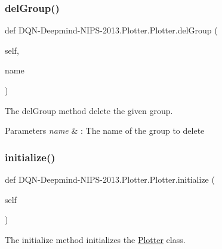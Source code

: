 \subsubsection{\texorpdfstring{del\+Group()}{delGroup()}}
{\footnotesize\ttfamily def D\+QN-\/Deepmind-\/N\+I\+PS-\/2013.Plotter.\+Plotter.\+del\+Group (\begin{DoxyParamCaption}\item[{}]{self,  }\item[{}]{name }\end{DoxyParamCaption})}



The del\+Group method delete the given group. 


\begin{DoxyParams}{Parameters}
{\em name} & \+: The name of the group to delete \\
\hline
\end{DoxyParams}
\hypertarget{classDQN-Deepmind-NIPS-2013_1_1Plotter_1_1Plotter_a8e1227cf851a49de8362084fe06846fa}{}\label{classDQN-Deepmind-NIPS-2013_1_1Plotter_1_1Plotter_a8e1227cf851a49de8362084fe06846fa} 
\subsubsection{\texorpdfstring{initialize()}{initialize()}}
{\footnotesize\ttfamily def D\+QN-\/Deepmind-\/N\+I\+PS-\/2013.Plotter.\+Plotter.\+initialize (\begin{DoxyParamCaption}\item[{}]{self }\end{DoxyParamCaption})}



The initialize method initializes the \hyperlink{classDQN-Deepmind-NIPS-2013_1_1Plotter_1_1Plotter}{Plotter} class. 

\hypertarget{classDQN-Deepmind-NIPS-2013_1_1Plotter_1_1Plotter_a781363a311a4b659f454b9f10a930fe5}{}\label{classDQN-Deepmind-NIPS-2013_1_1Plotter_1_1Plotter_a781363a311a4b659f454b9f10a930fe5} 
